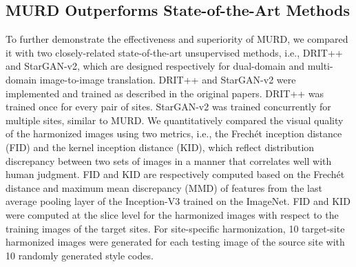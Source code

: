 \documentclass{nature}
\begin{document}

\subsection{MURD Outperforms State-of-the-Art Methods}
To further demonstrate the effectiveness and superiority of MURD, we compared it with two closely-related state-of-the-art unsupervised methods, i.e., DRIT++\cite{Lee2020DRIT} and StarGAN-v2\cite{Choi2020StarGANv2}, which are designed respectively for dual-domain and multi-domain image-to-image translation.
DRIT++ and StarGAN-v2 were implemented and trained as described in the original papers\cite{Lee2020DRIT,Choi2020StarGANv2}.
DRIT++ was trained once for every pair of sites. StarGAN-v2 was trained concurrently for multiple sites, similar to MURD.
We quantitatively compared the visual quality of the harmonized images using two metrics, i.e., the Frech\'{e}t inception distance (FID)\cite{Heusel2017Gans} and the kernel inception distance (KID)\cite{Binkowski2018Demystifying}, which reflect distribution discrepancy between two sets of images
in a manner that correlates well with human judgment\cite{salimans2016improved}. FID and KID are respectively computed based on the Frech\'{e}t distance and maximum mean discrepancy (MMD) of features from the last average pooling layer of the Inception-V3\cite{Szegedy2016Rethinking} trained on the ImageNet\cite{deng2009imagenet}. 
FID and KID were computed at the slice level for the harmonized images with respect to the training images of the target sites.
For site-specific harmonization, 10 target-site harmonized images were generated for each testing image of the source site with 10 randomly generated style codes.
\end{document}
